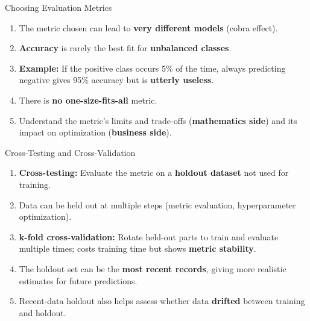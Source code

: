 \begin{frame}{Choosing Evaluation Metrics}
\begin{enumerate}
\item<1-> The metric chosen can lead to \textbf{very different models} (cobra effect).
\item<2-> \textbf{Accuracy} is rarely the best fit for \textbf{unbalanced classes}.
\item<3-> \textbf{Example:} If the positive class occurs 5\% of the time, always predicting negative gives 95\% accuracy but is \textbf{utterly useless}.
\item<4-> There is \textbf{no one-size-fits-all} metric.
\item<5-> Understand the metric's limits and trade-offs (\textbf{mathematics side}) and its impact on optimization (\textbf{business side}).
\end{enumerate}
\end{frame}

\begin{frame}{Cross-Testing and Cross-Validation}
\begin{enumerate}
\item<1-> \textbf{Cross-testing:} Evaluate the metric on a \textbf{holdout dataset} not used for training.
\item<2-> Data can be held out at multiple steps (metric evaluation, hyperparameter optimization).
\item<3-> \textbf{k-fold cross-validation:} Rotate held-out parts to train and evaluate multiple times; costs training time but shows \textbf{metric stability}.
\item<4-> The holdout set can be the \textbf{most recent records}, giving more realistic estimates for future predictions.
\item<5-> Recent-data holdout also helps assess whether data \textbf{drifted} between training and holdout.
\end{enumerate}
\end{frame}

